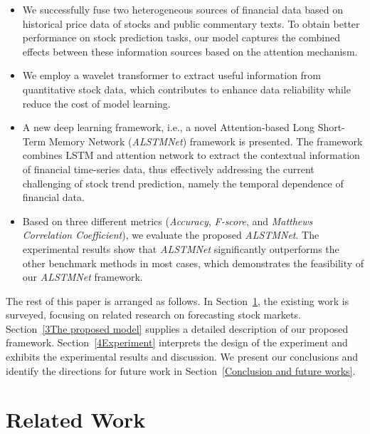 \documentclass[sn-mathphys]{sn-jnl}%
\theoremstyle{thmstyleone}%
\theoremstyle{thmstyletwo}%
\theoremstyle{thmstylethree}%
\begin{document}
\begin{itemize}
	\item We successfully fuse two heterogeneous sources of financial data based on historical price data of stocks and public commentary texts. To obtain better performance on stock prediction tasks, our model captures the combined effects between these information sources based on the attention mechanism.
    \item We employ a wavelet transformer to extract useful information from quantitative stock data, which contributes to enhance data reliability while reduce the cost of model learning.
	\item A new deep learning framework, i.e., a novel Attention-based Long Short-Term Memory Network ({\it ALSTMNet}) framework is presented. The framework combines LSTM and attention network to extract the contextual information of financial time-series data, thus effectively addressing the current challenging of stock trend prediction, namely the temporal dependence of financial data.
	\item Based on three different metrics ({\it Accuracy}, {\it F-score}, and {\it Matthews Correlation Coefficient}), we evaluate the proposed {\it ALSTMNet}. The experimental results show that {\it ALSTMNet} significantly outperforms the other benchmark methods in most cases, which demonstrates the feasibility of our {\it ALSTMNet} framework.
\end{itemize}

The rest of this paper is arranged as follows. In Section~\ref{2Related work}, the existing work is surveyed, focusing on related research on forecasting stock markets. Section~\ref{3The proposed model} supplies a detailed description of our proposed framework. Section~\ref{4Experiment} interprets the design of the experiment and exhibits the experimental results and discussion. We present our conclusions and identify the directions for future work in Section~\ref{Conclusion and future works}.

\section{Related Work}\label{2Related work}
\end{document}

